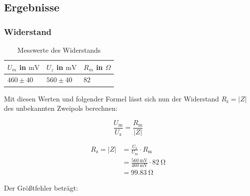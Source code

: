     \subsection{Ergebnisse}

        \subsubsection{Widerstand}
         \label{sec:Versuch2_Widerstand}

            \begin{table}[H]
                \centering
                \caption{Messwerte des Widerstands}
                \vspace{1em}
                \begin{tabular}{|l|l|l|}
                    \hline
                    $U_m$ in $\mathrm{mV}$ & $U_z$ in $\mathrm{mV}$ & $R_{m}$ in $\Omega$\\
                    \hline
                    \hline
                    $460 \pm 40$ & $560 \pm 40$ & $82$\\
                    \hline
                \end{tabular}
                \label{tab:Versuch2_Widerstand}
            \end{table}

            Mit diesen Werten und folgender Formel lässt sich nun der Widerstand $R_{\mathrm{z}} = |Z|$ des unbekannten Zweipols berechnen:

            \begin{equation}
                \frac{U_{\mathrm{m}}}{U_{\mathrm{z}}} = \frac{R_{\mathrm{m}}}{|Z|}
                \label{eq:Versuch2_Widerstand_Formel}
            \end{equation}
            
            \begin{equation}
                \begin{aligned}
                    R_{\mathrm{z}} = |Z| &= \frac{U_{\mathrm{z}}}{U_{\mathrm{m}}} \cdot R_{\mathrm{m}}\\
                                   &= \frac{560\ \mathrm{mV}}{460\ \mathrm{mV}} \cdot 82\ \mathrm{\Omega}\\
                                   &= 99.83\ \mathrm{\Omega}
                \end{aligned}
                \label{eq:Versuch2_Widerstand}
            \end{equation}

            Der Größtfehler beträgt:

